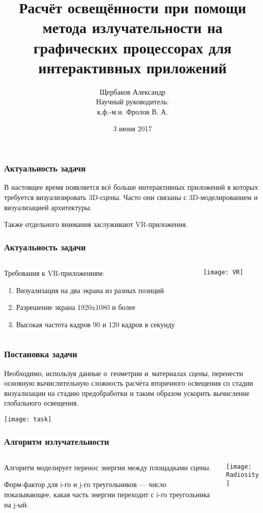 \documentclass[unicode, dvipsnames]{beamer}
\title{Расчёт освещённости при помощи метода излучательности на графических процессорах для интерактивных приложений}
\author{\small Щербаков Александр \\ \vspace{10pt} Научный руководитель: \\ к.ф.-м.н. Фролов В. А.}
\date{\small 3 июня 2017}
\begin{document}
\frame[plain]{\titlepage}

\begin{frame}
	\frametitle{Актуальность задачи}
	
	В настоящее время появляется всё больше интерактивных приложений в которых требуется визуализировать 3D-сцены. Часто они связаны с 3D-моделированием и визуализацией архитектуры. 
	
	Также отдельного внимания заслуживают VR-приложения.
\end{frame}

\begin{frame}
	\frametitle{Актуальность задачи}
	\begin{columns}[T]
    	\begin{column}[T]{5cm}
			Требования к VR-приложениям:
    		
		    \begin{enumerate}
		    	\item Визуализация на два экрана из разных позиций
		    	\item Разрешение экрана 1920x1080 и более
		    	\item Высокая частота кадров 90 и 120 кадров в секунду
		    \end{enumerate}
	    \end{column}
    	\begin{column}[T]{5cm}
			\texttt{[image: VR]}
    	\end{column}
    \end{columns}
\end{frame}

\begin{frame}
	\frametitle{Постановка задачи}
	
	Необходимо, используя данные о~геометрии и~материалах сцены, перенести основную вычислительную сложность расчёта вторичного освещения со стадии визуализации на стадию предобработки и таким образом ускорить вычисление глобального освещения.

	\texttt{[image: task]}
\end{frame}

\begin{frame}
	\frametitle{Алгоритм излучательности}
	\begin{columns}[T]
    	\begin{column}[T]{5cm}
			Алгоритм моделирует перенос энергии между площадками сцены.
			
			Форм-фактор для i-го и j-го треугольников --- число показывающее, какая часть энергии переходит с i-го треугольника на j-ый.
	    \end{column}
    	\begin{column}[T]{5cm}
			\texttt{[image: Radiosity]}
    	\end{column}
    \end{columns}
\end{frame}
\end{document}
